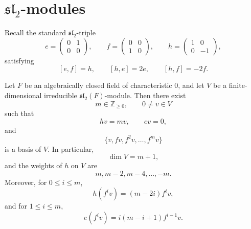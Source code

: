 \section{\texorpdfstring{\(\mathfrak{sl}_2\)-modules}{sl2-modules}}

Recall the standard \(\mathfrak{sl}_2\)-triple
\[
    e=\begin{pmatrix}0&1\\0&0\end{pmatrix},\qquad
    f=\begin{pmatrix}0&0\\1&0\end{pmatrix},\qquad
    h=\begin{pmatrix}1&0\\0&-1\end{pmatrix},
\]
satisfying
\[
    [e,f]=h,\qquad [h,e]=2e,\qquad [h,f]=-2f.
\]

\begin{theorem}\label{thm:sl2-irreducible}
    Let \(F\) be an algebraically closed field of characteristic \(0\), and let \(V\) be a finite-dimensional irreducible \(\mathfrak{sl}_2(F)\)-module. Then there exist
    \[
        m\in \mathbb Z_{\ge 0},\qquad 0\neq v\in V
    \]
    such that
    \[
        hv=mv,\qquad ev=0,
    \]
    and
    \[
        \{v,fv,f^2v,\dots,f^mv\}
    \]
    is a basis of \(V\). In particular,
    \[
        \dim V=m+1,
    \]
    and the weights of \(h\) on \(V\) are
    \[
        m,m-2,m-4,\dots,-m.
    \]
    Moreover, for \(0\le i\le m\),
    \[
        h(f^iv)=(m-2i)f^iv,
    \]
    and for \(1\le i\le m\),
    \[
        e(f^iv)=i(m-i+1)f^{i-1}v.
    \]
\end{theorem}

